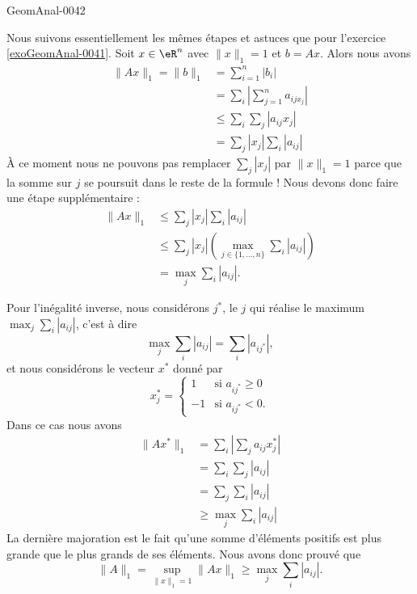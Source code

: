 \begin{corrige}{GeomAnal-0042}

    Nous suivons essentiellement les mêmes étapes et astuces que pour l'exercice \ref{exoGeomAnal-0041}. Soit \( x\in\eR^n\) avec \( \| x \|_1=1\) et \( b=Ax\). Alors nous avons
    \begin{subequations}
        \begin{align}
            \| Ax \|_1=\| b \|_1&=\sum_{i=1}^n| b_i |\\
            &=\sum_i\left| \sum_{j=1}^na_{ijx_j} \right| \\
            &\leq\sum_i\sum_j| a_{ij}x_j |\\
            &=\sum_j| x_j |\sum_i| a_{ij} |
        \end{align}
    \end{subequations}
    À ce moment nous ne pouvons pas remplacer \( \sum_j| x_j |\) par \( \| x \|_1=1\) parce que la somme sur \( j\) se poursuit dans le reste de la formule ! Nous devons donc faire une étape supplémentaire :
    \begin{subequations}
        \begin{align}
            \| Ax \|_1&\leq\sum_j| x_j |\sum_i| a_{ij} |\\
            &\leq\sum_j| x_j |\left( \max_{j\in\{ 1,\ldots,n \}}\sum_i| a_{ij} | \right)\\
            &=\max_j\sum_{i}| a_{ij} |.
        \end{align}
    \end{subequations}

    Pour l'inégalité inverse, nous considérons \( j^*\), le \( j\) qui réalise le maximum \( \max_j\sum_i| a_{ij} |\), c'est à dire
    \begin{equation}
        \max_j\sum_i| a_{ij} |=\sum_i| a_{ij^*} |,
    \end{equation}
    et nous considérons le vecteur \( x^*\) donné par
    \begin{equation}
        x^*_j=\begin{cases}
            1    &   \text{si } a_{ij^*}\geq 0\\
            -1    &    \text{si }a_{ij^*}<0.
        \end{cases}
    \end{equation}
    Dans ce cas nous avons
    \begin{subequations}
        \begin{align}
            \| Ax^* \|_1&=\sum_i\left| \sum_ja_{ij}x_j^* \right| \\
            &=\sum_i\sum_j| a_{ij} |\\
            &=\sum_{j}\sum_i| a_{ij} |\\
            &\geq\max_j\sum_i| a_{ij} |
        \end{align}
    \end{subequations}
    La dernière majoration est le fait qu'une somme d'éléments positifs est plus grande que le plus grands de ses éléments. Nous avons donc prouvé que
    \begin{equation}
        \| A \|_1=\sup_{\| x \|_1=1}\| Ax \|_1\geq\max_j\sum_i| a_{ij} |.
    \end{equation}

\end{corrige}

